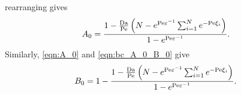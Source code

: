 rearranging gives
\begin{equation}
    \label{eqn:A_0}
    A_0 = \frac{1 -
    \frac{\mathrm{Da}}{\mathrm{Pe}} \left(N - e^{\mathrm{Pe} \varepsilon^{-1}} \sum_{i=1}^{N} e^{-\mathrm{Pe}
    \xi_i}\right)}{1 - e^{\mathrm{Pe} \varepsilon^{-1}}}.
\end{equation}
Similarly, \eqref{eqn:A_0} and \eqref{eqn:bc_A_0_B_0} give
\begin{equation}
    \label{eqn:B_0}
    B_0 = 1 - \frac{1 -
    \frac{\mathrm{Da}}{\mathrm{Pe}} \left(N - e^{\mathrm{Pe} \varepsilon^{-1}} \sum_{i=1}^{N} e^{-\mathrm{Pe}
    \xi_i}\right)}{1 - e^{\mathrm{Pe} \varepsilon^{-1}}}.
\end{equation}

